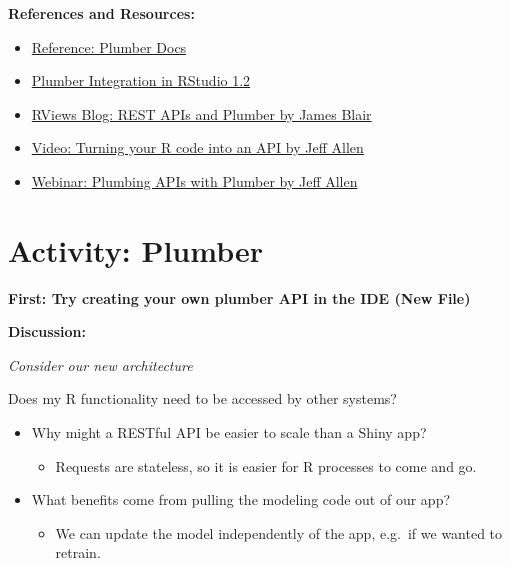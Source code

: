 \documentclass[]{book}
\providecommand{\tightlist}{%
  \setlength{\itemsep}{0pt}\setlength{\parskip}{0pt}}
\theoremstyle{definition}
\theoremstyle{definition}
\theoremstyle{definition}
\theoremstyle{remark}
\begin{document}
\textbf{References and Resources:}

\begin{itemize}
\tightlist
\item
  \href{https://www.rplumber.io/}{Reference: Plumber Docs}
\item
  \href{https://blog.rstudio.com/2018/10/23/rstudio-1-2-preview-plumber-integration/}{Plumber
  Integration in RStudio 1.2}
\item
  \href{https://rviews.rstudio.com/2018/07/23/rest-apis-and-plumber/}{RViews
  Blog: REST APIs and Plumber by James Blair}
\item
  \href{https://www.rstudio.com/resources/videos/plumber-turning-your-r-code-into-an-api/}{Video:
  Turning your R code into an API by Jeff Allen}
\item
  \href{https://www.rstudio.com/resources/videos/plumbing-apis-with-plumber/}{Webinar:
  Plumbing APIs with Plumber by Jeff Allen}
\end{itemize}

\hypertarget{activity-plumber}{%
\section{Activity: Plumber}\label{activity-plumber}}

\textbf{First: Try creating your own plumber API in the IDE (New File)}

\textbf{Discussion:}

\emph{Consider our new architecture}

Does my R functionality need to be accessed by other systems?

\begin{itemize}
\tightlist
\item
  Why might a RESTful API be easier to scale than a Shiny app?

  \begin{itemize}
  \tightlist
  \item
    Requests are stateless, so it is easier for R processes to come and
    go.
  \end{itemize}
\item
  What benefits come from pulling the modeling code out of our app?

  \begin{itemize}
  \tightlist
  \item
    We can update the model independently of the app, e.g.~if we wanted
    to retrain.
  \end{itemize}
\end{itemize}
\end{document}
